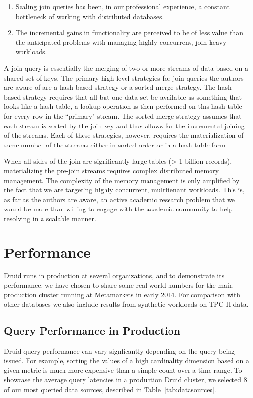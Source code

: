 \documentclass{sig-alternate-2013}
\begin{document}
\begin{enumerate}
\item Scaling join queries has been, in our professional experience, a constant bottleneck of working with distributed databases.
\item The incremental gains in functionality are perceived to be of less value than the anticipated problems with managing highly concurrent, join-heavy workloads.
\end{enumerate}

A join query is essentially the merging of two or more streams of data based on
a shared set of keys.  The primary high-level strategies for join queries the
authors are aware of are a hash-based strategy or a sorted-merge strategy.  The
hash-based strategy requires that all but one data set be available as
something that looks like a hash table, a lookup operation is then performed on
this hash table for every row in the ``primary" stream.  The sorted-merge
strategy assumes that each stream is sorted by the join key and thus allows for
the incremental joining of the streams.  Each of these strategies, however,
requires the materialization of some number of the streams either in sorted
order or in a hash table form.  

When all sides of the join are significantly large tables (> 1 billion records),
materializing the pre-join streams requires complex distributed memory
management.  The complexity of the memory management is only amplified by
the fact that we are targeting highly concurrent, multitenant workloads.
This is, as far as the authors are aware, an active academic research
problem that we would be more than willing to engage with the academic
community to help resolving in a scalable manner.


\section{Performance}
\label{sec:benchmarks}
Druid runs in production at several organizations, and to demonstrate its
performance, we have chosen to share some real world numbers for the main production
cluster running at Metamarkets in early 2014. For comparison with other databases
we also include results from synthetic workloads on TPC-H data.

\subsection{Query Performance in Production}
Druid query performance can vary signficantly depending on the query
being issued. For example, sorting the values of a high cardinality dimension
based on a given metric is much more expensive than a simple count over a time
range. To showcase the average query latencies in a production Druid cluster,
we selected 8 of our most queried data sources, described in Table~\ref{tab:datasources}.
\end{document}

